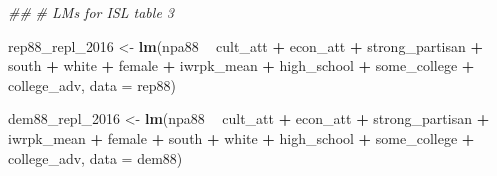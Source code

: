 \documentclass[
]{article}
\newenvironment{Shaded}{\begin{snugshade}}{\end{snugshade}}
\newcommand{\CommentTok}[1]{\textcolor[rgb]{0.56,0.35,0.01}{\textit{#1}}}
\newcommand{\DataTypeTok}[1]{\textcolor[rgb]{0.13,0.29,0.53}{#1}}
\newcommand{\DecValTok}[1]{\textcolor[rgb]{0.00,0.00,0.81}{#1}}
\newcommand{\KeywordTok}[1]{\textcolor[rgb]{0.13,0.29,0.53}{\textbf{#1}}}
\newcommand{\NormalTok}[1]{#1}
\newcommand{\OperatorTok}[1]{\textcolor[rgb]{0.81,0.36,0.00}{\textbf{#1}}}
\newcommand{\StringTok}[1]{\textcolor[rgb]{0.31,0.60,0.02}{#1}}
\begin{document}
\begin{Shaded}
\begin{Highlighting}[]
\CommentTok{##}
\CommentTok{# LMs for ISL table 3}


\NormalTok{rep88_repl_}\DecValTok{2016}\NormalTok{ <-}\StringTok{ }\KeywordTok{lm}\NormalTok{(npa88 }\OperatorTok{~}\StringTok{ }\NormalTok{cult_att }\OperatorTok{+}\StringTok{ }\NormalTok{econ_att }\OperatorTok{+}\StringTok{ }\NormalTok{strong_partisan }\OperatorTok{+}\StringTok{ }
\StringTok{                                            }\NormalTok{south }\OperatorTok{+}\StringTok{ }\NormalTok{white }\OperatorTok{+}\StringTok{ }\NormalTok{female }\OperatorTok{+}
\StringTok{                                            }\NormalTok{iwrpk_mean }\OperatorTok{+}
\StringTok{                                            }\NormalTok{high_school }\OperatorTok{+}\StringTok{ }\NormalTok{some_college }\OperatorTok{+}\StringTok{ }\NormalTok{college_adv, }\DataTypeTok{data =}\NormalTok{ rep88)}

\NormalTok{dem88_repl_}\DecValTok{2016}\NormalTok{ <-}\StringTok{ }\KeywordTok{lm}\NormalTok{(npa88 }\OperatorTok{~}\StringTok{ }\NormalTok{cult_att }\OperatorTok{+}\StringTok{ }\NormalTok{econ_att }\OperatorTok{+}\StringTok{ }\NormalTok{strong_partisan }\OperatorTok{+}\StringTok{ }\NormalTok{iwrpk_mean }\OperatorTok{+}
\StringTok{                                            }\NormalTok{female }\OperatorTok{+}\StringTok{ }\NormalTok{south }\OperatorTok{+}\StringTok{ }\NormalTok{white }\OperatorTok{+}
\StringTok{                                            }\NormalTok{high_school }\OperatorTok{+}\StringTok{ }\NormalTok{some_college }\OperatorTok{+}\StringTok{ }\NormalTok{college_adv, }\DataTypeTok{data =}\NormalTok{ dem88)}


\end{Highlighting}
\end{Shaded}
\end{document}
